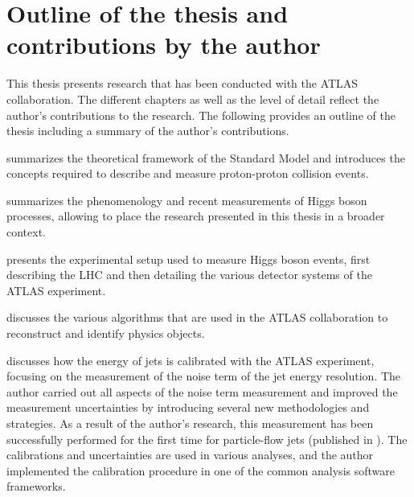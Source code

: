 



\section*{Outline of the thesis and contributions by the author}
This thesis presents research that has been conducted with the ATLAS collaboration. 
The different chapters as well as the level of detail reflect the author's contributions to the research.
The following provides an outline of the thesis including a summary of the author's contributions.

 summarizes the theoretical framework of the Standard Model and introduces the concepts required to describe and measure proton-proton collision events. 

 summarizes the phenomenology and recent measurements of Higgs boson processes, allowing to place the research presented in this thesis in a broader context. 

 presents the experimental setup used to measure Higgs boson events, first describing the LHC and then detailing the various detector systems of the ATLAS experiment.

 discusses the various algorithms that are used in the ATLAS collaboration to reconstruct and identify physics objects. 

 discusses how the energy of jets is calibrated with the ATLAS experiment, focusing on the measurement of the noise term of the jet energy resolution. 
The author carried out all aspects of the noise term measurement and improved the measurement uncertainties by introducing several new methodologies and strategies. As a result of the author's research, this measurement has been successfully performed for the first time for particle-flow jets (published in ). The calibrations and uncertainties are used in various analyses, and the author implemented the calibration procedure in one of the common analysis software frameworks.

